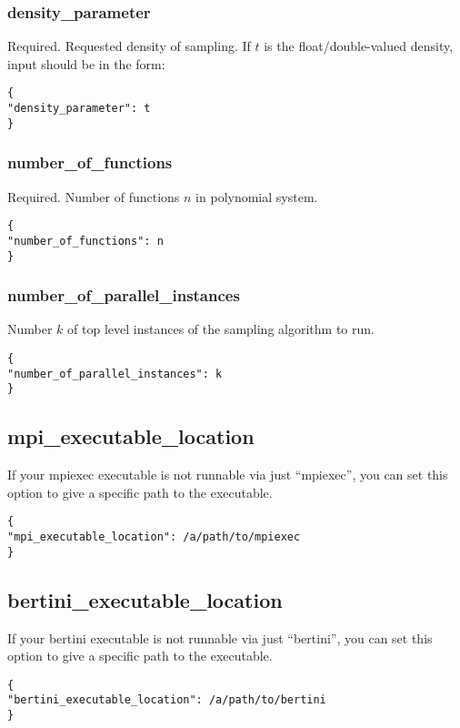 \documentclass[11pt]{article}
\begin{document}
\subsubsection{density\_parameter}
Required. Requested density of sampling. If $t$ is the float/double-valued density, input should be in the form: 

\begin{verbatim}
{
"density_parameter": t
}
\end{verbatim} 

\subsubsection{number\_of\_functions}
Required. Number of functions $n$ in polynomial system. 

\begin{verbatim} 
{
"number_of_functions": n
}
\end{verbatim}

\subsubsection{number\_of\_parallel\_instances}
Number $k$ of top level instances of the sampling algorithm to run. 

\begin{verbatim}
{ 
"number_of_parallel_instances": k
}
\end{verbatim} 

\subsection{mpi\_executable\_location}

If your mpiexec executable is not runnable via just ``mpiexec'', you can set this option to give a specific path to the executable. 

\begin{verbatim}
{ 
"mpi_executable_location": /a/path/to/mpiexec
}
\end{verbatim} 

\subsection{bertini\_executable\_location} 

If your bertini executable is not runnable via just ``bertini'', you can set this option to give a specific path to the executable. 

\begin{verbatim}
{ 
"bertini_executable_location": /a/path/to/bertini
}
\end{verbatim} 
\end{document}
